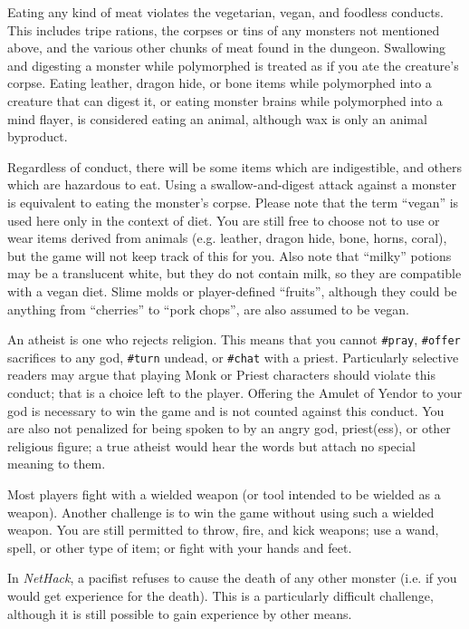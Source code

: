 Eating any kind of meat violates the vegetarian, vegan, and foodless
conducts.  This includes tripe rations, the corpses or tins of any
monsters not mentioned above, and the various other chunks of meat
found in the dungeon.  Swallowing and digesting a monster while polymorphed
is treated as if you ate the creature's corpse.
Eating leather, dragon hide, or bone items while
polymorphed into a creature that can digest it, or eating monster brains
while polymorphed into a mind flayer, is considered eating
an animal, although wax is only an animal byproduct.

Regardless of conduct, there will be some items which are indigestible,
and others which are hazardous to eat.  Using a swallow-and-digest
attack against a monster is equivalent to eating the monster's corpse.
Please note that the term ``vegan'' is used here only in the context of
diet.  You are still free to choose not to use or wear items derived
from animals (e.g. leather, dragon hide, bone, horns, coral), but the
game will not keep track of this for you.  Also note that ``milky''
potions may be a translucent white, but they do not contain milk,
so they are compatible with a vegan diet.  Slime molds or
player-defined ``fruits'', although they could be anything
from ``cherries'' to ``pork chops'', are also assumed to be vegan.

An atheist is one who rejects religion.  This means that you cannot
{\tt \#pray}, {\tt \#offer} sacrifices to any god,
{\tt \#turn} undead, or {\tt \#chat} with a priest.
Particularly selective readers may argue that playing Monk or Priest
characters should violate this conduct; that is a choice left to the
player.  Offering the Amulet of Yendor to your god is necessary to
win the game and is not counted against this conduct.  You are also
not penalized for being spoken to by an angry god, priest(ess), or
other religious figure; a true atheist would hear the words but
attach no special meaning to them.

Most players fight with a wielded weapon (or tool intended to be
wielded as a weapon).  Another challenge is to win the game without
using such a wielded weapon.  You are still permitted to throw,
fire, and kick weapons; use a wand, spell, or other type of item;
or fight with your hands and feet.

In {\it NetHack}, a pacifist refuses to cause the death of any other monster
(i.e. if you would get experience for the death).  This is a particularly
difficult challenge, although it is still possible to gain experience
by other means.

